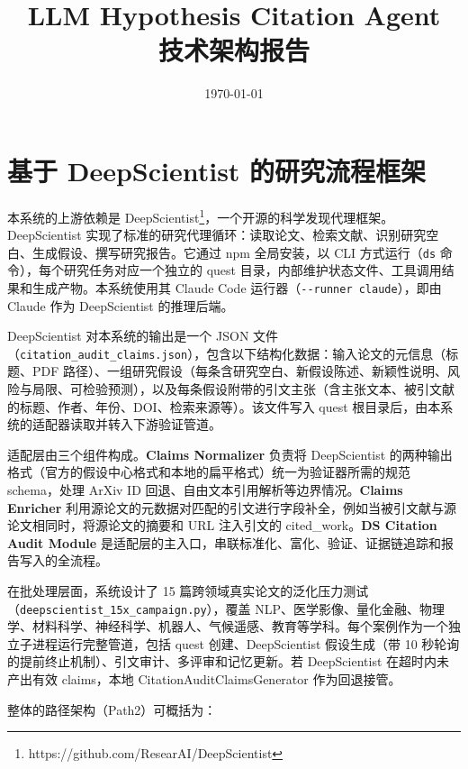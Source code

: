\documentclass[11pt,a4paper]{ctexart}
\title{\bfseries\large LLM Hypothesis Citation Agent\\[4pt]\normalsize\mdseries 技术架构报告}
\author{}
\date{\today}
\begin{document}
\maketitle
\thispagestyle{empty}
\vspace{-18pt}

\section{基于 DeepScientist 的研究流程框架}

本系统的上游依赖是 DeepScientist\footnote{https://github.com/ResearAI/DeepScientist}，一个开源的科学发现代理框架。DeepScientist 实现了标准的研究代理循环：读取论文、检索文献、识别研究空白、生成假设、撰写研究报告。它通过 npm 全局安装，以 CLI 方式运行（\texttt{ds} 命令），每个研究任务对应一个独立的 quest 目录，内部维护状态文件、工具调用结果和生成产物。本系统使用其 Claude Code 运行器（\texttt{-{}-runner claude}），即由 Claude 作为 DeepScientist 的推理后端。

DeepScientist 对本系统的输出是一个 JSON 文件（\texttt{citation\_audit\_claims.json}），包含以下结构化数据：输入论文的元信息（标题、PDF 路径）、一组研究假设（每条含研究空白、新假设陈述、新颖性说明、风险与局限、可检验预测），以及每条假设附带的引文主张（含主张文本、被引文献的标题、作者、年份、DOI、检索来源等）。该文件写入 quest 根目录后，由本系统的适配器读取并转入下游验证管道。

适配层由三个组件构成。\textbf{Claims Normalizer} 负责将 DeepScientist 的两种输出格式（官方的假设中心格式和本地的扁平格式）统一为验证器所需的规范 schema，处理 ArXiv ID 回退、自由文本引用解析等边界情况。\textbf{Claims Enricher} 利用源论文的元数据对匹配的引文进行字段补全，例如当被引文献与源论文相同时，将源论文的摘要和 URL 注入引文的 cited\_work。\textbf{DS Citation Audit Module} 是适配层的主入口，串联标准化、富化、验证、证据链追踪和报告写入的全流程。

在批处理层面，系统设计了 15 篇跨领域真实论文的泛化压力测试（\texttt{deepscientist\_15x\_campaign.py}），覆盖 NLP、医学影像、量化金融、物理学、材料科学、神经科学、机器人、气候遥感、教育等学科。每个案例作为一个独立子进程运行完整管道，包括 quest 创建、DeepScientist 假设生成（带 10 秒轮询的提前终止机制）、引文审计、多评审和记忆更新。若 DeepScientist 在超时内未产出有效 claims，本地 CitationAuditClaimsGenerator 作为回退接管。

整体的路径架构（Path2）可概括为：
\end{document}
